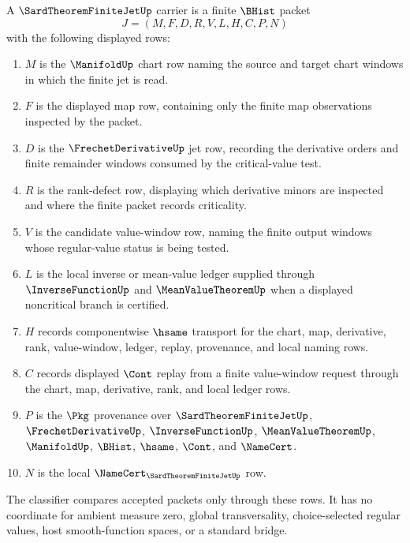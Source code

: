 \begin{definition}
\label{def:sard-theorem-finite-jet-carrier}
A $\SardTheoremFiniteJetUp$ carrier is a finite $\BHist$ packet
$$
J=(M,F,D,R,V,L,H,C,P,N)
$$
with the following displayed rows:
\begin{enumerate}
\item $M$ is the $\ManifoldUp$ chart row naming the source and target chart windows in which the finite jet is read.
\item $F$ is the displayed map row, containing only the finite map observations inspected by the packet.
\item $D$ is the $\FrechetDerivativeUp$ jet row, recording the derivative orders and finite remainder windows consumed by the critical-value test.
\item $R$ is the rank-defect row, displaying which derivative minors are inspected and where the finite packet records criticality.
\item $V$ is the candidate value-window row, naming the finite output windows whose regular-value status is being tested.
\item $L$ is the local inverse or mean-value ledger supplied through $\InverseFunctionUp$ and $\MeanValueTheoremUp$ when a displayed noncritical branch is certified.
\item $H$ records componentwise $\hsame$ transport for the chart, map, derivative, rank, value-window, ledger, replay, provenance, and local naming rows.
\item $C$ records displayed $\Cont$ replay from a finite value-window request through the chart, map, derivative, rank, and local ledger rows.
\item $P$ is the $\Pkg$ provenance over $\SardTheoremFiniteJetUp$, $\FrechetDerivativeUp$, $\InverseFunctionUp$, $\MeanValueTheoremUp$, $\ManifoldUp$, $\BHist$, $\hsame$, $\Cont$, and $\NameCert$.
\item $N$ is the local $\NameCert_{\SardTheoremFiniteJetUp}$ row.
\end{enumerate}
The classifier compares accepted packets only through these rows. It has no coordinate for ambient measure zero, global transversality, choice-selected regular values, host smooth-function spaces, or a standard bridge.
\end{definition}


